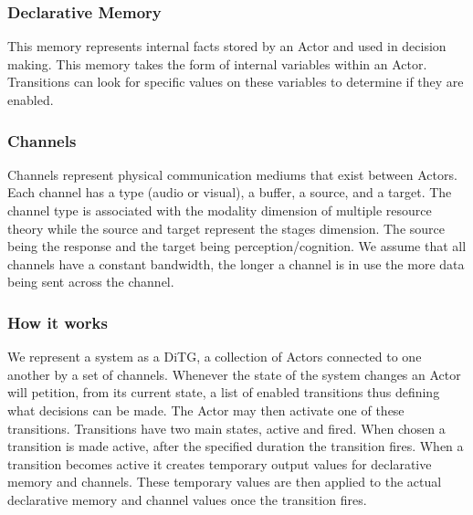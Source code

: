 \subsubsection{Declarative Memory }
This memory represents internal facts stored by an Actor and used in decision
making.  This memory takes the form of internal variables within an Actor. 
Transitions can look for specific values on these variables to determine if they are enabled.

\subsubsection{Channels} 
Channels represent physical communication mediums that exist between Actors. 
Each channel has a type (audio or visual), a buffer, a source, and a target. 
The channel type is associated with the modality dimension of multiple resource
theory while the source and target represent the stages
dimension\cite{wickens2002multiple}.  The source being the response and the
target being perception/cognition.  We assume that all channels have a constant
bandwidth, the longer a channel is in use the more data being sent across the channel.  

\subsubsection{How it works}
We represent a system as a DiTG, a collection of
Actors connected to one another by a set of channels.  Whenever the state of the
system changes an Actor will petition, from its current state, a list of enabled
transitions thus defining what decisions can be made.  The Actor may then
activate one of these transitions.  Transitions have two main states, active and
fired.  When chosen a transition is made active, after the specified duration
the transition fires.  When a transition becomes active it creates temporary
output values for declarative memory and channels.  These temporary values are
then applied to the actual declarative memory and channel values once the transition fires.

